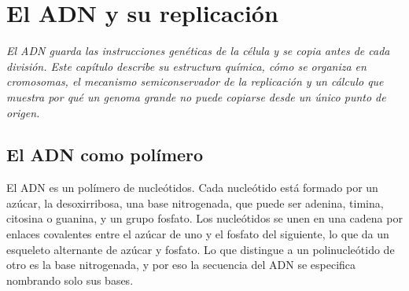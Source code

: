 \documentclass{book}
\begin{document}
\chapter{El ADN y su replicación}
\label{chap:bio-04}

\noindent\textit{El ADN guarda las instrucciones genéticas de la célula y se copia antes de cada división. Este capítulo describe su estructura química, cómo se organiza en cromosomas, el mecanismo semiconservador de la replicación y un cálculo que muestra por qué un genoma grande no puede copiarse desde un único punto de origen.}


\section{El ADN como polímero}

El ADN es un polímero de nucleótidos. Cada nucleótido está formado por un azúcar, la desoxirribosa, una base nitrogenada, que puede ser adenina, timina, citosina o guanina, y un grupo fosfato. Los nucleótidos se unen en una cadena por enlaces covalentes entre el azúcar de uno y el fosfato del siguiente, lo que da un esqueleto alternante de azúcar y fosfato. Lo que distingue a un polinucleótido de otro es la base nitrogenada, y por eso la secuencia del ADN se especifica nombrando solo sus bases.

\end{document}
